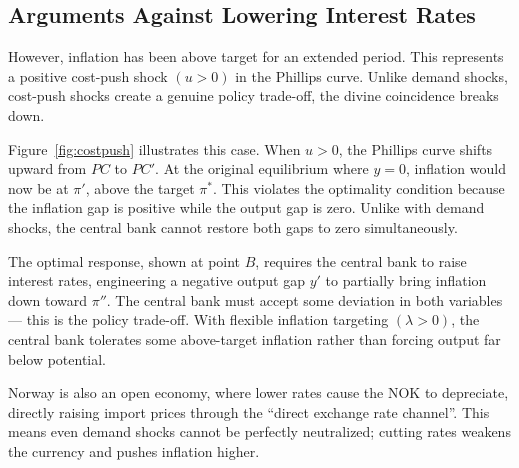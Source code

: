 \documentclass[10pt]{article}
\begin{document}
\subsection{Arguments Against Lowering Interest Rates}

However, inflation has been above target for an extended period. This represents a positive cost-push shock $(u > 0)$ in the Phillips curve. Unlike demand shocks, cost-push shocks create a genuine policy trade-off, the divine coincidence breaks down. 

Figure~\ref{fig:costpush} illustrates this case. When $u > 0$, the Phillips curve shifts upward from $PC$ to $PC'$. At the original equilibrium where $y = 0$, inflation would now be at $\pi'$, above the target $\pi^*$. This violates the optimality condition because the inflation gap is positive while the output gap is zero. Unlike with demand shocks, the central bank cannot restore both gaps to zero simultaneously.

The optimal response, shown at point $B$, requires the central bank to raise interest rates, engineering a negative output gap $y'$ to partially bring inflation down toward $\pi''$. The central bank must accept some deviation in both variables --- this is the policy trade-off. With flexible inflation targeting $(\lambda > 0)$, the central bank tolerates some above-target inflation rather than forcing output far below potential.

Norway is also an open economy, where lower rates cause the NOK to depreciate, directly raising import prices through the ``direct exchange rate channel''. This means even demand shocks cannot be perfectly neutralized; cutting rates weakens the currency and pushes inflation higher.
\end{document}
